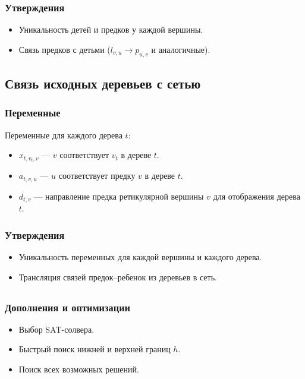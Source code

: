 \documentclass[hyperref={unicode}]{beamer}
\begin{document}
\begin{frame}
\frametitle{Утверждения}

\begin{itemize}
	\item Уникальность детей и предков у каждой вершины.
	\item Связь предков с детьми ($l_{v, u} \rightarrow p_{u, v}$ и аналогичные).
\end{itemize}

\end{frame}

\subsection{Связь исходных деревьев с сетью}

\begin{frame}
\frametitle{Переменные}

Переменные для каждого дерева $t$:

\begin{itemize}
	\item $x_{t, v_t, v}$ --- $v$ соответствует $v_t$ в дереве $t$.
	\item $a_{t, v, u}$ --- $u$ соответствует предку $v$ в дереве $t$.
	\item $d_{t, v}$ --- направление предка ретикулярной вершины $v$ для отображения дерева $t$.
\end{itemize}

\end{frame}

\begin{frame}
\frametitle{Утверждения}

\begin{itemize}
	\item Уникальность переменных для каждой вершины и каждого дерева.
	\item Трансляция связей предок--ребенок из деревьев в сеть.
\end{itemize}

\end{frame}

\subsection{}

\begin{frame}
\frametitle{Дополнения и оптимизации}

\begin{itemize}
	\item Выбор SAT-солвера.
	\item Быстрый поиск нижней и верхней границ $h$.
	\item Поиск всех возможных решений.
\end{itemize}

\end{frame}
\end{document}
